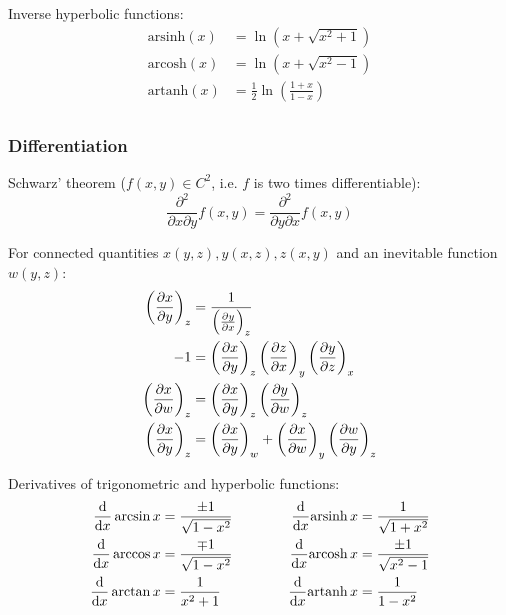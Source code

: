 			\noindent
			Inverse hyperbolic functions:
			\begin{equation}
				\begin{aligned}
					\mathrm{arsinh}(x) &= \ln\left(x+\sqrt{x^2+1}\right) \\
					\mathrm{arcosh}(x) &= \ln\left(x+\sqrt{x^2-1}\right) \\
					\mathrm{artanh}(x) &= \frac{1}{2}\ln\left(\frac{1+x}{1-x}\right) \\
				\end{aligned}
			\end{equation}

		\subsubsection{Differentiation}
			\noindent
			Schwarz' theorem ($f(x,y)\in C^2$, i.e. $f$ is two times differentiable):
			\begin{equation}
				\frac{\partial^2 }{\partial x \partial y} f(x,y) = \frac{\partial^2 }{\partial y \partial x} f(x,y)
			\end{equation}

			\noindent
			For connected quantities $x(y,z), y(x,z), z(x,y)$ and an inevitable function $w(y,z)$:
			\begin{equation}
				\begin{aligned}
					\left( \pdv{x}{y} \right)_z &= \frac{1}{\left( \pdv{y}{x} \right)_z} \\
					-1 &= \left( \pdv{x}{y} \right)_z \left( \pdv{z}{x} \right)_y \left( \pdv{y}{z} \right)_x \\
					\left( \pdv{x}{w} \right)_z &= \left( \pdv{x}{y} \right)_z \left( \pdv{y}{w} \right)_z \\
					\left( \pdv{x}{y} \right)_z &= \left( \pdv{x}{y} \right)_w + \left( \pdv{x}{w} \right)_y \left( \pdv{w}{y} \right)_z \\
				\end{aligned}
			\end{equation}

			\noindent
			Derivatives of trigonometric and hyperbolic functions:
			\begin{equation}
				\begin{split}
					\frac{\dd}{\dd x}\arcsin x &= \frac{\pm 1}{\sqrt{1-x^2}} \hspace{30pt}
					&\frac{\dd}{\dd x}\mathrm{arsinh}\,x &= \frac{1}{\sqrt{1+x^2}} \\
					\frac{\dd}{\dd x}\arccos x &= \frac{\mp 1}{\sqrt{1-x^2}} \hspace{30pt}
					&\frac{\dd}{\dd x}\mathrm{arcosh}\,x &= \frac{\pm 1}{\sqrt{x^2-1}} \\
					\frac{\dd}{\dd x}\arctan x &= \frac{1}{x^2+1} \hspace{30pt}
					&\frac{\dd}{\dd x}\mathrm{artanh}\,x &= \frac{1}{1-x^2} \\
				\end{split}
			\end{equation}

